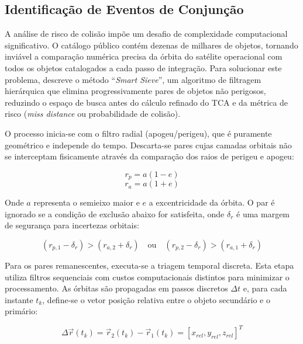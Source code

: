\subsection{Identificação de Eventos de Conjunção}
\label{subsec:identificacao_conjuncoes}

A análise de risco de colisão impõe um desafio de complexidade computacional significativo. O catálogo público contém dezenas de milhares de objetos, tornando inviável a comparação numérica precisa da órbita do satélite operacional com todos os objetos catalogados a cada passo de integração. Para solucionar este problema,  descreve o método ``\textit{Smart Sieve}'', um algoritmo de filtragem hierárquica que elimina progressivamente pares de objetos não perigosos, reduzindo o espaço de busca antes do cálculo refinado do TCA e da métrica de risco (\textit{miss distance} ou probabilidade de colisão).

O processo inicia-se com o filtro radial (apogeu/perigeu), que é puramente geométrico e independe do tempo. Descarta-se pares cujas camadas orbitais não se interceptam fisicamente através da comparação dos raios de perigeu e apogeu:

\begin{equation}
    r_p = a(1-e)
\end{equation}
\begin{equation}
    r_a = a(1+e)
\end{equation}

Onde $a$ representa o semieixo maior e $e$ a excentricidade da órbita. O par é ignorado se a condição de exclusão abaixo for satisfeita, onde $\delta_r$ é uma margem de segurança para incertezas orbitais:

\begin{equation}
    (r_{p,1} - \delta_r) > (r_{a,2} + \delta_r) \quad \text{ou} \quad (r_{p,2} - \delta_r) > (r_{a,1} + \delta_r)
\end{equation}

Para os pares remanescentes, executa-se a triagem temporal discreta. Esta etapa utiliza filtros sequenciais com custos computacionais distintos para minimizar o processamento. As órbitas são propagadas em passos discretos $\Delta t$ e, para cada instante $t_k$, define-se o vetor posição relativa entre o objeto secundário e o primário:

\begin{equation}
    \Delta \vec{r}(t_k) = \vec{r}_2(t_k) - \vec{r}_1(t_k) = [x_{rel}, y_{rel}, z_{rel}]^T
\end{equation}

